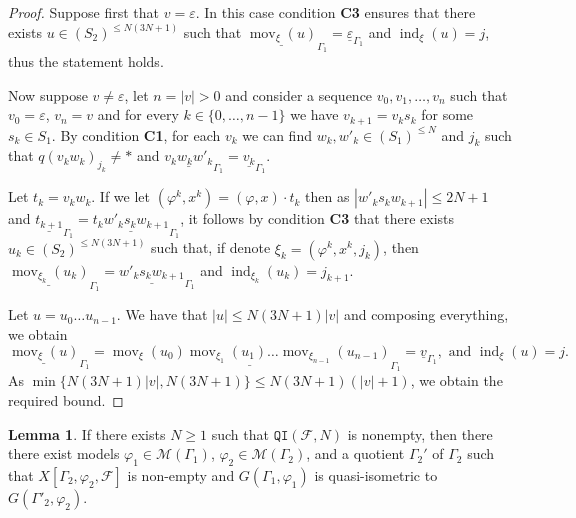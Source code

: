\documentclass{article}
\theoremstyle{definition}
\newtheorem{lemma}[theorem]{Lemma}
\theoremstyle{definition}
\newcommand{\M}{\mathcal{M}}
\newcommand{\Fo}{\mathcal{F}}
\newcommand{\QI}{\mathtt{QI}}
\newcommand{\mov}{\operatorname{mov}}
\newcommand{\ind}{\operatorname{ind}}
\begin{document}
\begin{proof}
    Suppose first that $v=\varepsilon$. In this case condition \textbf{C3} ensures that there exists $u \in (S_2)^{\leq N(3N+1)}$ such that $\underline{\mov_{{\xi}}(u)}_{\Gamma_1}= \underline{\varepsilon}_{\Gamma_1}$ and $\ind_{\xi}(u) = j$, thus the statement holds.

    Now suppose $v \neq \varepsilon$, let $n = |v| >0$ and consider a sequence $v_0,v_1,\dots,v_n$ such that $v_0 = \varepsilon$, $v_n = v$ and for every $k \in \{0,\dots,n-1\}$ we have $v_{k+1} = v_{k}s_k$ for some $s_k \in S_1$. By condition \textbf{C1}, for each $v_k$ we can find $w_k,w'_k\in (S_1)^{\leq N}$ and $j_k$ such that $q(v_kw_k)_{j_k}\neq \ast$ and $\underline{v_kw_kw'_k}_{\Gamma_1}=\underline{v_k}_{\Gamma_1}$. 

    Let $t_k = v_kw_k$. If we let $(\varphi^k,x^k)=(\varphi,x)\cdot t_k$ then as $|w'_ks_kw_{k+1}| \leq 2N+1$ and $\underline{t_{k+1}}_{\Gamma_1}= \underline{t_kw'_ks_kw_{k+1}}_{\Gamma_1}$, it follows by condition \textbf{C3} that there exists $u_k \in (S_2)^{\leq N(3N+1)}$ such that, if denote ${\xi}_k = (\varphi^k,x^k, j_k)$, then $\underline{\mov_{{\xi}_k}(u_k)}_{\Gamma_1} = \underline{w'_ks_kw_{k+1}}_{\Gamma_1}$ and $\ind_{{\xi}_k}(u_k) = j_{k+1}$. 
    
    Let $u = u_0\dots u_{n-1}$. We have that $|u| \leq N(3N+1)|v|$ and composing everything, we obtain \[\underline{\mov_{\xi}(u)}_{\Gamma_1} = \underline{\mov_{\xi}(u_0)\mov_{{\xi}_1}(u_1) \dots \mov_{{\xi}_{n-1}}(u_{n-1})}_{\Gamma_1} = \underline{v}_{\Gamma_1}, \mbox{ and } \ind_{\xi}(u) = j.    \]
    As $\min\{ N(3N+1)|v|, N(3N+1)\} \leq  N(3N+1)(|v|+1)$, we obtain the required bound.
\end{proof}

\begin{lemma}
\label{lem:vuelta}
    If there exists $N\geq 1$ such that $\QI(\Fo,N)$ is nonempty, then there there exist models $\varphi_1\in\M(\Gamma_1)$, $\varphi_2\in\M(\Gamma_2)$, and a quotient $\Gamma_2'$ of $\Gamma_2$ such that $X[\Gamma_2, \varphi_2,\Fo]$ is non-empty and $G(\Gamma_1, \varphi_1)$ is quasi-isometric to $G(\Gamma'_2,\varphi_2)$.
\end{lemma}
\end{document}
